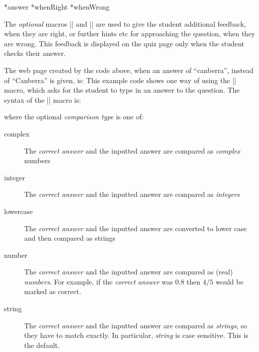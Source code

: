 \documentclass[svgnames]{article}
\makeatletter
\newcommand\macroIndex[1]{%
  \lowercase{\def\temp{#1}}%
  \expandafter\index\expandafter{\temp@\textbackslash#1}%
}
\makeatother
\begin{document}
  \macroIndex{answer}*{answer}
  *{whenRight}
  *{whenWrong}

  The \textit{optional} macros \LatexCode|\whenRight| and
  \LatexCode|\whenWrong| are used to give the student additional
  feedback, when they are right, or further hints etc for approaching
  the question, when they are wrong. This feedback is displayed on the
  quiz page only when the student checks their answer.

  The web page created by the code above, when an answer of
  ``canberra'', instead of ``Canberra'' is given, is:
  This example code shows one way of using the \LatexCode|\answer| macro, which
  asks for the student to type in an answer to the question. The syntax of the
  \LatexCode|\answer| macro is:
  \begin{latexcode}
  \end{latexcode}
  where the optional \textit{comparison type} is one of:
  \begin{description}
      \item[complex] 
      The \textit{correct answer} and the inputted answer
      are compared as \textit{complex} numbers
      \item[integer] 
      The \textit{correct answer} and the inputted answer
      are compared as \textit{integers}
      \item[lowercase] 
      The \textit{correct answer} and the inputted answer
      are converted to lower case and then compared as strings
      \item[number] 
      The \textit{correct answer} and the inputted answer
      are compared as (real) \textit{numbers}. For example, if the
      \textit{correct answer} was $0.8$ then $4/5$ would be marked as
      correct.
      \item[string] 
      The \textit{correct answer} and the inputted answer are compared
      as \textit{strings}, so they have to match exactly. In particular,
      \textit{string} is case sensitive. This is the default.
  \end{description}
\end{document}
